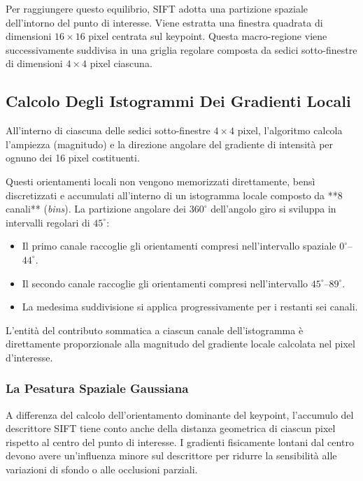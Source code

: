 ﻿\documentclass[11pt, a4paper]{article}
\begin{document}
Per raggiungere questo equilibrio, SIFT adotta una partizione spaziale dell'intorno del punto di interesse. Viene estratta una finestra quadrata di dimensioni $16 \times 16$ pixel centrata sul keypoint. Questa macro-regione viene successivamente suddivisa in una griglia regolare composta da sedici sotto-finestre di dimensioni $4 \times 4$ pixel ciascuna.


\subsection{Calcolo Degli Istogrammi Dei Gradienti Locali}

All'interno di ciascuna delle sedici sotto-finestre $4 \times 4$ pixel, l'algoritmo calcola l'ampiezza (magnitudo) e la direzione angolare del gradiente di intensità per ognuno dei 16 pixel costituenti.


Questi orientamenti locali non vengono memorizzati direttamente, bensì discretizzati e accumulati all'interno di un istogramma locale composto da **8 canali** (\emph{bins}). La partizione angolare dei $360^{\circ}$ dell'angolo giro si sviluppa in intervalli regolari di $45^{\circ}$:
\begin{itemize}
    \item Il primo canale raccoglie gli orientamenti compresi nell'intervallo spaziale $0^{\circ}$–$44^{\circ}$.
    \item Il secondo canale raccoglie gli orientamenti compresi nell'intervallo $45^{\circ}$–$89^{\circ}$.
    \item La medesima suddivisione si applica progressivamente per i restanti sei canali.
\end{itemize}

L'entità del contributo sommatica a ciascun canale dell'istogramma è direttamente proporzionale alla magnitudo del gradiente locale calcolata nel pixel d'interesse.

\subsubsection{La Pesatura Spaziale Gaussiana}
A differenza del calcolo dell'orientamento dominante del keypoint, l'accumulo del descrittore SIFT tiene conto anche della distanza geometrica di ciascun pixel rispetto al centro del punto di interesse. I gradienti fisicamente lontani dal centro devono avere un'influenza minore sul descrittore per ridurre la sensibilità alle variazioni di sfondo o alle occlusioni parziali.
\end{document}
